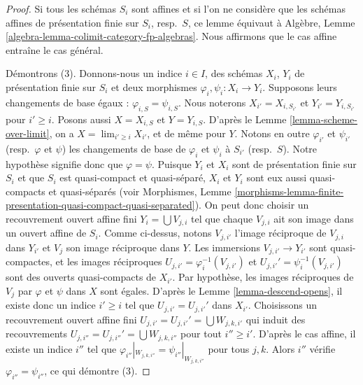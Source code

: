 \begin{proof}
Si tous les schémas $S_i$ sont affines et si l'on ne considère
que les schémas affines de présentation finie sur $S_i$, resp.\ $S$,
ce lemme équivaut à
Algèbre, Lemme \ref{algebra-lemma-colimit-category-fp-algebras}.
Nous affirmons que le cas affine entraîne le cas général.

\medskip\noindent
Démontrons (3). Donnons-nous un indice $i \in I$, des schémas
$X_i$, $Y_i$ de présentation finie sur $S_i$ et deux morphismes
$\varphi_i, \psi_i : X_i \to Y_i$. Supposons leurs changements de base
égaux : $\varphi_{i, S} = \psi_{i, S}$. Nous noterons
$X_{i'} = X_{i, S_{i'}}$ et $Y_{i'} = Y_{i, S_{i'}}$ pour
$i' \geq i$. Posons aussi $X = X_{i, S}$ et $Y = Y_{i, S}$.
D'après le Lemme \ref{lemma-scheme-over-limit}, on a
$X = \lim_{i' \geq i} X_{i'}$, et de même pour $Y$.
Notons en outre $\varphi_{i'}$ et $\psi_{i'}$
(resp.\ $\varphi$ et $\psi$)
les changements de base de $\varphi_i$ et $\psi_i$ à $S_{i'}$
(resp.\ $S$). Notre hypothèse signifie donc que $\varphi = \psi$.
Puisque $Y_i$ et $X_i$ sont de présentation finie
sur $S_i$ et que $S_i$ est quasi-compact et quasi-séparé,
$X_i$ et $Y_i$ sont eux aussi quasi-compacts et quasi-séparés
(voir Morphismes,
Lemme \ref{morphisms-lemma-finite-presentation-quasi-compact-quasi-separated}).
On peut donc choisir un recouvrement ouvert affine fini
$Y_i = \bigcup V_{j, i}$ tel que chaque $V_{j, i}$ ait son image dans
un ouvert affine de $S_i$. Comme ci-dessus, notons $V_{j, i'}$ l'image
réciproque de $V_{j, i}$ dans $Y_{i'}$ et $V_j$ son image réciproque dans $Y$.
Les immersions $V_{j, i'} \to Y_{i'}$ sont quasi-compactes, et les images réciproques
$U_{j, i'} = \varphi_i^{-1}(V_{j, i'})$ et
$U_{j, i'}' = \psi_i^{-1}(V_{j, i'})$
sont des ouverts quasi-compacts de $X_{i'}$. Par hypothèse, les images réciproques
de $V_j$ par $\varphi$ et $\psi$ dans $X$ sont égales.
D'après le Lemme \ref{lemma-descend-opens},
il existe donc un indice $i' \geq i$ tel que
$U_{j, i'} = U_{j, i'}'$ dans $X_{i'}$.
Choisissons un recouvrement ouvert affine fini
$U_{j, i'} = U_{j, i'}' = \bigcup W_{j, k, i'}$
qui induit des recouvrements $U_{j, i''} = U_{j, i''}' = \bigcup W_{j, k, i''}$
pour tout $i'' \geq i'$.
D'après le cas affine, il existe
un indice $i''$ tel que
$\varphi_{i''}|_{W_{j, k, i''}} = \psi_{i''}|_{W_{j, k, i''}}$
pour tous $j, k$. Alors $i''$ vérifie
$\varphi_{i''} = \psi_{i''}$, ce qui démontre (3).


\end{proof}
